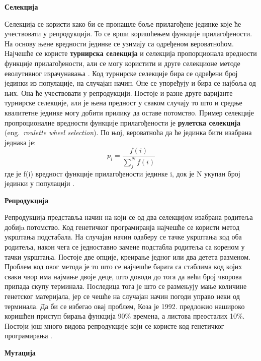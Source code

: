 \documentclass[a4paper]{article}
\begin{document}
\bigskip
\noindent
\textbf{\large Селекција}\newline

Селекција се користи како би се пронашле боље прилагођене јединке које ће учествовати у репродукцији. То се врши коришћењем функције прилагођености. На основу њене вредности јединке се узимају са одређеном вероватноћом. Најчешће се користе \textbf{турнирска селекција} и селекција пропорционала вредности функције прилагођености, али се могу користити и друге селекционе методе еволутивног израчунавања \cite{compIntelligence}. Код турнирске селекције бира се одређени број јединки из популације, на случајан начин. Оне се упоређују и бира се најбоља од њих. Она ће учествовати у репродукцији. Постоје и разне друге варијанте турнирске селекције, али је њена предност у сваком случају то што и средње квалитетне јединке могу добити прилику да оставе потомство. Пример селекције пропроционалне вредности функције прилагођености је \textbf{рулетска селекција} (eng.~{\em roulette wheel selection}). По њој, вероватноћа да ће јединка бити изабрана једнака је: 
\begin{equation} 
    p_i = \frac{f(i)}{\sum_{j}^{N} f(i)}
\end{equation}
где је f(i) вредност функције прилагођености јединке i, док је N укупан број јединки у популацији \cite{vi}.\newline


\bigskip
\noindent
\textbf{\large Репродукција}\newline

Репродукција представља начин на који се од два селекцијом изабрана родитеља добијa потомство. Код генетичког програмиранја најчешће се користи метод укрштања подстабала. На случајан начин одаберу се тачке укрштања код оба родитеља, након чега се једноставно замене подстабла родитеља са кореном у тачки укрштања. Постоје две опције, креирање једног или два детета разменом. Проблем код овог метода је то што се најчешће барата са стаблима код којих сваки чвор има најмање двоје деце, што доводи до тога да већи број чворова припада скупу терминала. Последица тога је што се размењују мање количине генетског материјала, јер се чешће на случајан начин погоди управо неки од терминала. Да би се избегао овај проблем, Коза је 1992. предложио нашироко коришћен приступ бирања функција 90\% времена, а листова преосталих 10\%. Постоји још много видова репродукције који се користе код генетичког програмирања \cite{fieldGuidetoGP}.\newline

\bigskip
\noindent
\textbf{\large Мутација}\newline
\end{document}
